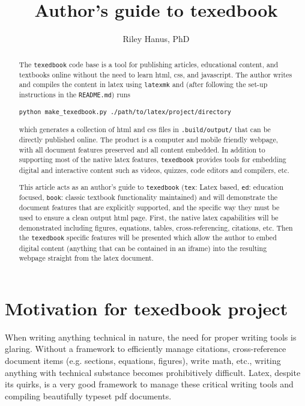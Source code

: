 \documentclass{article}
\title{Author's guide to texedbook}
\author{Riley Hanus, PhD}
\date{}
\begin{document}
 
\maketitle

\begin{abstract}
The \verb'texedbook' code base is a tool for publishing articles, educational content, and textbooks online without the need to learn html, css, and javascript. The author writes and compiles the content in latex using \verb'latexmk' and (after following the set-up instructions in the \verb'README.md') runs 
\begin{verbatim}
python make_texedbook.py ./path/to/latex/project/directory
\end{verbatim}
which generates a collection of html and css files in \verb'.build/output/' that can be directly published online. The product is a computer and mobile friendly webpage, with all document features preserved and all content embedded.  In addition to supporting most of the native latex features, \verb'texedbook' provides tools for embedding digital and interactive content such as videos, quizzes, code editors and compilers, etc. 

This article acts as an author's guide to \verb'texedbook' (\verb'tex': Latex based, \verb'ed': education focused, \verb'book': classic textbook functionality maintained) and will demonstrate the document features that are explicitly supported, and the specific way they must be used to ensure a clean output html page.  First, the native latex capabilities will be demonstrated including figures, equations, tables, cross-referencing, citations, etc. Then the \verb'texedbook' specific features will be presented which allow the author to embed digital content (anything that can be contained in an iframe) into the resulting webpage straight from the latex document. 
\end{abstract}

\section{Motivation for texedbook project}

When writing anything technical in nature, the need for proper writing tools is glaring. Without a framework to efficiently manage citations, cross-reference document items (e.g. sections, equations, figures), write math, etc., writing anything with technical substance becomes prohibitively difficult. Latex, despite its quirks, is a very good framework to manage these critical writing tools and compiling beautifully typeset pdf documents.
\end{document}
